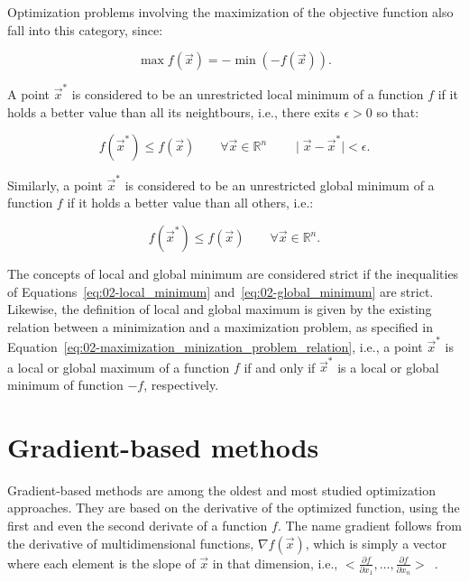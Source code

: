 Optimization problems involving the maximization of the objective
function also fall into this category, since:

\begin{equation}
\max f(\vec{x})=-\min(-f(\vec{x})).\label{eq:02-maximization_minization_problem_relation}
\end{equation}


A point $\vec{x}^{*}$ is considered to be an unrestricted local minimum
of a function $f$ if it holds a better value than all its neightbours,
i.e., there exits $\epsilon>0$ so that:

\begin{equation}
f(\vec{x}^{*})\le f(\vec{x})\qquad\forall\vec{x}\in\mathbb{R}^{n}\qquad\mid\vec{x}-\vec{x}^{*}\mid<\epsilon.\label{eq:02-local_minimum}
\end{equation}


\noindent Similarly, a point $\vec{x}^{*}$ is considered to be an
unrestricted global minimum of a function $f$ if it holds a better
value than all others, i.e.:

\begin{equation}
f(\vec{x}^{*})\leq f(\vec{x})\qquad\forall\vec{x}\in\mathbb{R}^{n}.\label{eq:02-global_minimum}
\end{equation}


The concepts of local and global minimum are considered strict if
the inequalities of Equations~\ref{eq:02-local_minimum} and~\ref{eq:02-global_minimum}
are strict. Likewise, the definition of local and global maximum is
given by the existing relation between a minimization and a maximization
problem, as specified in Equation~\ref{eq:02-maximization_minization_problem_relation},
i.e., a point $\vec{x}^{*}$ is a local or global maximum of a function
$f$ if and only if $\vec{x}^{*}$ is a local or global minimum of
function $-f$, respectively.


\section{Gradient-based methods \label{sec:02-Gradient-based-methods}}

Gradient-based methods are among the oldest and most studied optimization
approaches. They are based on the derivative of the optimized function,
using the first and even the second derivate of a function $f$. The
name gradient follows from the derivative of multidimensional functions,
$\nabla f(\vec{x})$, which is simply a vector where each element
is the slope of $\vec{x}$ in that dimension, i.e., $<\frac{\partial f}{\partial x_{1}},\dots,\frac{\partial f}{\partial x_{n}}>$~\cite{Luke-Essentials_of_metaheuristics:2009}.


